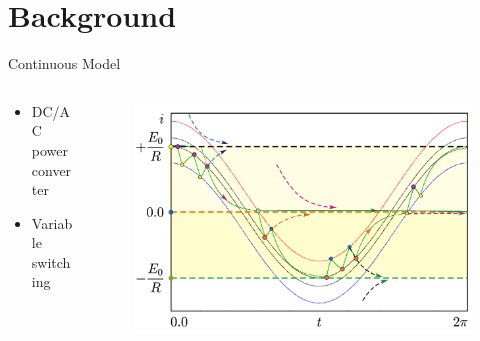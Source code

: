 \section{Background}

\begin{frame}{Continuous Model}
    \vspace{-1em}
    \begin{columns}
        \begin{column}{.4 \textwidth}
            \begin{itemize}
                \item DC/AC power converter
                \item Variable switching
            \end{itemize}
        \end{column}
        \begin{column}{.6 \textwidth}
            \begin{figure}
                \includegraphics[width=0.8 \textwidth]{Figs/continuous_model.png}
            \end{figure}

            \flushright{[Zhusubaliyev]}
        \end{column}
    \end{columns}
\end{frame}

